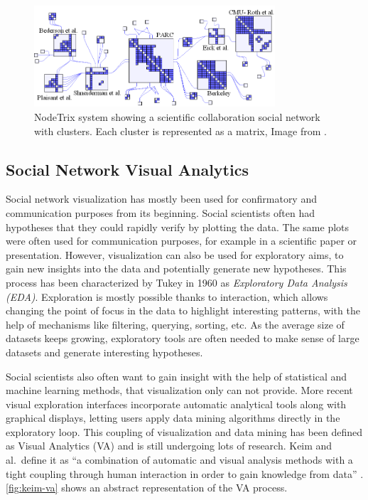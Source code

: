 \begin{figure}
    \centering %
    \includegraphics[width=0.8\textwidth]{static/figures/RelatedWork/NodeTrix.png}
    \caption{NodeTrix system showing a scientific collaboration social network with clusters. Each cluster is represented as a matrix,  Image from \cite{henryNodeTrixHybridVisualization2007}.}
    \label{fig:Riche-NodeTrix}
\end{figure}


\subsection{Social Network Visual Analytics}

Social network visualization has mostly been used for confirmatory and communication purposes from its beginning.
Social scientists often had hypotheses that they could rapidly verify by plotting the data.
The same plots were often used for communication purposes, for example in a scientific paper or presentation.
However, visualization can also be used for exploratory aims, to gain new insights into the data and potentially generate new hypotheses.
This process has been characterized by Tukey in 1960 as \emph{Exploratory Data Analysis (EDA)}.
Exploration is mostly possible thanks to interaction, which allows changing the point of focus in the data to highlight interesting patterns, with the help of mechanisms like filtering, querying, sorting, etc.
As the average size of datasets keeps growing, exploratory tools are often needed to make sense of large datasets and generate interesting hypotheses.

Social scientists also often want to gain insight with the help of statistical and machine learning methods, that visualization only can not provide.
More recent visual exploration interfaces incorporate automatic analytical tools along with graphical displays, letting users apply data mining algorithms directly in the exploratory loop.
This coupling of visualization and data mining has been defined as Visual Analytics (VA) and is still undergoing lots of research.
Keim and al.\ define it as ``a combination of automatic and visual analysis methods with a tight coupling through human interaction in order to gain knowledge from data'' \cite{keimVisualAnalyticsDefinition2008}. \autoref{fig:keim-va} shows an abstract representation of the VA process.

